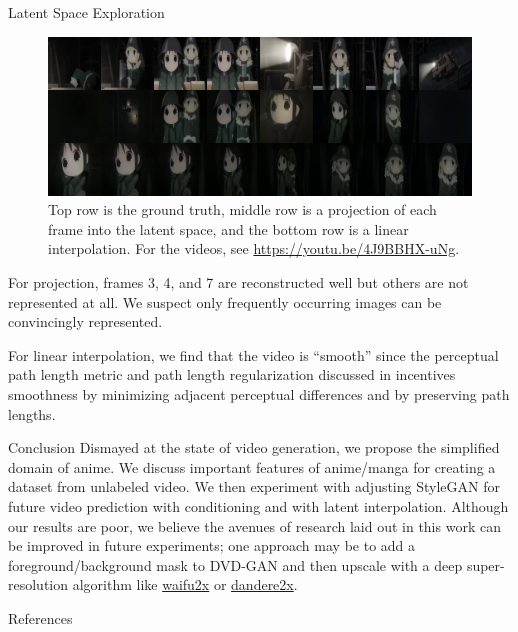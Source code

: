\documentclass{beamer}                             %
\begin{document}
\begin{frame}
\begin{columns}
\begin{column}{0.33\textwidth}
      \begin{block}{Latent Space Exploration}
      \setlength{\parindent}{1em}
        \begin{figure}[h!]
          \centering
          \includegraphics[scale=0.4]{results_latent}
          \caption{Top row is the ground truth, middle row is a
            projection of each frame into the latent space, and the
            bottom row is a linear interpolation. For the videos, see
            \href{https://youtu.be/4J9BBHX-uNg}{https://youtu.be/4J9BBHX-uNg}.}
          \label{fig:latent}
        \end{figure}

        For projection, frames 3, 4, and 7 are reconstructed well
        but others are not represented at all. We suspect only
        frequently occurring images can be convincingly represented.

        For linear interpolation, we find that the video is \enquote{smooth}
        since the perceptual path length metric and path length regularization
        discussed in \cite{stylegan, stylegan2} incentives smoothness by
        minimizing adjacent perceptual differences and by preserving path
        lengths.
      \end{block}

      \begin{block}{Conclusion}
      \setlength{\parindent}{1em}
        Dismayed at the state of video generation, we propose the simplified
        domain of anime. We discuss important features of anime/manga for
        creating a dataset from unlabeled video. We then experiment with
        adjusting StyleGAN \cite{stylegan2ada} for future video prediction
        with conditioning and with latent interpolation. Although our
        results are poor, we believe the avenues of research laid out in
        this work can be improved in future experiments; one approach may
        be to add a foreground/background mask \cite{scene} to DVD-GAN
        \cite{dvdgan} and then upscale with a deep super-resolution
        algorithm like \href{https://github.com/nagadomi/waifu2x}{waifu2x}
        or \href{https://github.com/akai-katto/dandere2x}{dandere2x}.
      \end{block}

      \begin{block}{References}
        \printbibliography  
      \end{block}

    \end{column}

  \end{columns}
\end{frame}
\end{document}
